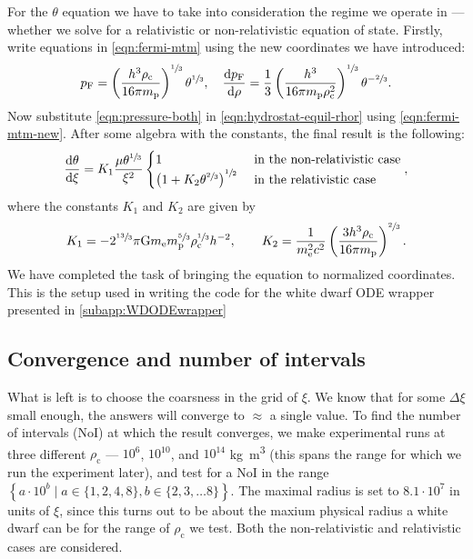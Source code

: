 \documentclass[]{article}
\newcommand{\dd}{\mathop{}\!\mathrm{d}}
\newcommand{\rhoCentre}{\rho_\mathrm{c}}
\newcommand{\fermiMtm}{p_\mathrm{F}}
\newcommand{\massElectron}{m_\mathrm{e}}
\newcommand{\massProton}{m_\mathrm{p}}
\newcommand{\gravconst}{\mathrm{G}}
\begin{document}
	For the $\theta$ equation we have to take into consideration the regime we operate in --- whether we solve for a relativistic or non-relativistic equation of state. Firstly, write equations in \eqref{eqn:fermi-mtm} using the new coordinates we have introduced:
	\begin{equation}\label{eqn:fermi-mtm-new}
		\fermiMtm = \left( \frac{h^3 \rhoCentre}{16 \pi \massProton}\right)^{\sfrac{1}{3}} \theta^{\sfrac{1}{3}} , \quad \frac{\dd \fermiMtm}{\dd \rho} = \frac{1}{3} \left( \frac{h^3}{16 \pi \massProton \rhoCentre^2}\right)^{\sfrac{1}{3}} \theta^{-\sfrac{2}{3}}.
	\end{equation}
	Now substitute \eqref{eqn:pressure-both} in \eqref{eqn:hydrostat-equil-rhor} using \eqref{eqn:fermi-mtm-new}. After some algebra with the constants, the final result is the following:
	\begin{equation}
		\frac{\dd \theta}{\dd \xi} = K_1 \frac{\mu \theta^{\sfrac{1}{3}}}{\xi^2} \begin{cases}
			1 & \text{ in the non-relativistic case}\\
			\left(1 + K_2 \theta^{\sfrac{2}{3}}\right)^{\sfrac{1}{2}} & \text{ in the relativistic case}
		\end{cases},
	\end{equation}
	where the constants $K_1$ and $K_2$ are given by
	\begin{equation}
		K_1 = - 2^{\sfrac{13}{3}} \pi \gravconst \massElectron \massProton^{\sfrac{5}{3}} \rhoCentre^{\sfrac{1}{3}} h^{-2} , \quad \quad K_2 = \frac{1}{\massElectron^2 c^2} \left( \frac{3h^3 \rhoCentre}{16 \pi \massProton} \right)^{\sfrac{2}{3}}.
	\end{equation}
	We have completed the task of bringing the equation to normalized coordinates. This is the setup used in writing the code for the white dwarf ODE wrapper presented in \ref{subapp:WDODEwrapper}

\subsection{Convergence and number of intervals}\label{subsec:convergence}
	What is left is to choose the coarsness in the grid of $\xi$. We know that for some $\Delta \xi$ small enough, the answers will converge to $\approx$ a single value. To find the number of intervals (NoI) at which the result converges, we make experimental runs at three different $\rhoCentre$ --- $10^6$, $10^{10}$, and $10^{14}$ \si{kg.m^3} (this spans the range for which we run the experiment later), and test for a NoI in the range $\left\{a \cdot 10^b \mid a \in \{1,2,4,8\}, b \in \{2,3,\ldots 8\}\right\}$. The maximal radius is set to $8.1 \cdot 10^7$ in units of $\xi$, since this turns out to be about the maxium physical radius a white dwarf can be for the range of $\rhoCentre$ we test. Both the non-relativistic and relativistic cases are considered.
\end{document}
